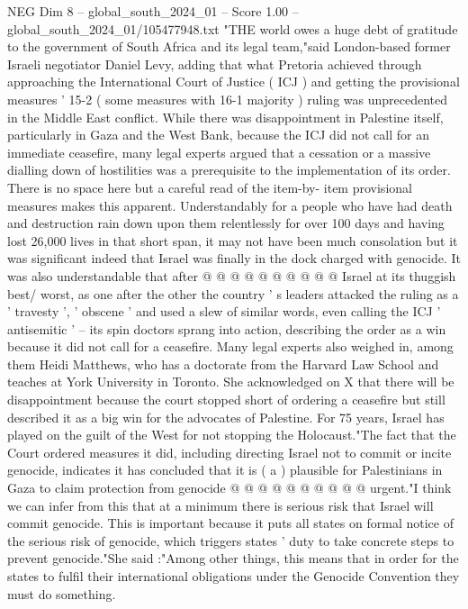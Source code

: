 \begin{textsample}{NEG Dim 8 – global\_south\_2024\_01 – Score 1.00 – global\_south\_2024\_01/105477948.txt}  \label{ex:f8_neg_178}
"THE world owes a huge debt of gratitude to the government of South Africa and its legal team,"said London-based former Israeli negotiator Daniel Levy, adding that what Pretoria achieved through approaching the International Court of Justice ( ICJ ) and getting the provisional measures ' 15-2 ( some measures with 16-1 majority ) ruling was unprecedented in the Middle East conflict.
While there was disappointment in Palestine itself, particularly in Gaza and the West Bank, because the ICJ did not call for an immediate ceasefire, many legal experts argued that a cessation or a massive dialling down of hostilities was a prerequisite to the implementation of its order.
There is no space here but a careful read of the item-by- item provisional measures makes this apparent.
Understandably for a people who have had death and destruction rain down upon them relentlessly for over 100 days and having lost 26,000 lives in that short span, it may not have been much consolation but it was significant indeed that Israel was finally in the dock charged with genocide.
It was also understandable that after @ @ @ @ @ @ @ @ @ @ Israel at its thuggish best/ worst, as one after the other the country ' s leaders attacked the ruling as a ' travesty ', ' obscene ' and used a slew of similar words, even calling the ICJ ' antisemitic ' -- its spin doctors sprang into action, describing the order as a win because it did not call for a ceasefire.
Many legal experts also weighed in, among them Heidi Matthews, who has a doctorate from the Harvard Law School and teaches at York University in Toronto.
She acknowledged on X that there will be disappointment because the court stopped short of ordering a ceasefire but still described it as a big win for the advocates of Palestine.
For 75 years, Israel has played on the guilt of the West for not stopping the Holocaust."The fact that the Court ordered measures it did, including directing Israel not to commit or incite genocide, indicates it has concluded that it is ( a ) plausible for Palestinians in Gaza to claim protection from genocide @ @ @ @ @ @ @ @ @ @ urgent."I think we can infer from this that at a minimum there is serious risk that Israel will commit genocide.
This is important because it puts all states on formal notice of the serious risk of genocide, which triggers states ' duty to take concrete steps to prevent genocide."She said :"Among other things, this means that in order for the states to fulfil their international obligations under the Genocide Convention they must do something.

\end{textsample}
